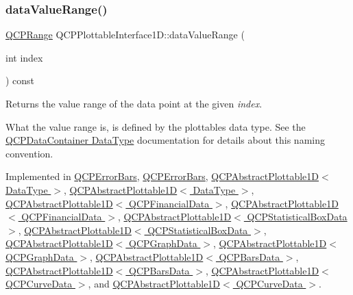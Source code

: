 \subsubsection{\texorpdfstring{data\+Value\+Range()}{dataValueRange()}}
{\footnotesize\ttfamily \hyperlink{class_q_c_p_range}{Q\+C\+P\+Range} Q\+C\+P\+Plottable\+Interface1\+D\+::data\+Value\+Range (\begin{DoxyParamCaption}\item[{int}]{index }\end{DoxyParamCaption}) const\hspace{0.3cm}{\ttfamily [pure virtual]}}

Returns the value range of the data point at the given {\itshape index}.

What the value range is, is defined by the plottable\textquotesingle{}s data type. See the \hyperlink{class_q_c_p_data_container_qcpdatacontainer-datatype}{Q\+C\+P\+Data\+Container Data\+Type} documentation for details about this naming convention. 

Implemented in \hyperlink{class_q_c_p_error_bars_a09b99cf293b6041ae8d5c52cf8dd599c}{Q\+C\+P\+Error\+Bars}, \hyperlink{class_q_c_p_error_bars_af3a66650bc2a36b06a7d77f879b7eb8c}{Q\+C\+P\+Error\+Bars}, \hyperlink{class_q_c_p_abstract_plottable1_d_ac6201b01aee550ef0a240183781d1f9a}{Q\+C\+P\+Abstract\+Plottable1\+D$<$ Data\+Type $>$}, \hyperlink{class_q_c_p_abstract_plottable1_d_a3070f8b8ce4729ea60837aac603aa0f9}{Q\+C\+P\+Abstract\+Plottable1\+D$<$ Data\+Type $>$}, \hyperlink{class_q_c_p_abstract_plottable1_d_ac6201b01aee550ef0a240183781d1f9a}{Q\+C\+P\+Abstract\+Plottable1\+D$<$ Q\+C\+P\+Financial\+Data $>$}, \hyperlink{class_q_c_p_abstract_plottable1_d_a3070f8b8ce4729ea60837aac603aa0f9}{Q\+C\+P\+Abstract\+Plottable1\+D$<$ Q\+C\+P\+Financial\+Data $>$}, \hyperlink{class_q_c_p_abstract_plottable1_d_ac6201b01aee550ef0a240183781d1f9a}{Q\+C\+P\+Abstract\+Plottable1\+D$<$ Q\+C\+P\+Statistical\+Box\+Data $>$}, \hyperlink{class_q_c_p_abstract_plottable1_d_a3070f8b8ce4729ea60837aac603aa0f9}{Q\+C\+P\+Abstract\+Plottable1\+D$<$ Q\+C\+P\+Statistical\+Box\+Data $>$}, \hyperlink{class_q_c_p_abstract_plottable1_d_ac6201b01aee550ef0a240183781d1f9a}{Q\+C\+P\+Abstract\+Plottable1\+D$<$ Q\+C\+P\+Graph\+Data $>$}, \hyperlink{class_q_c_p_abstract_plottable1_d_a3070f8b8ce4729ea60837aac603aa0f9}{Q\+C\+P\+Abstract\+Plottable1\+D$<$ Q\+C\+P\+Graph\+Data $>$}, \hyperlink{class_q_c_p_abstract_plottable1_d_ac6201b01aee550ef0a240183781d1f9a}{Q\+C\+P\+Abstract\+Plottable1\+D$<$ Q\+C\+P\+Bars\+Data $>$}, \hyperlink{class_q_c_p_abstract_plottable1_d_a3070f8b8ce4729ea60837aac603aa0f9}{Q\+C\+P\+Abstract\+Plottable1\+D$<$ Q\+C\+P\+Bars\+Data $>$}, \hyperlink{class_q_c_p_abstract_plottable1_d_ac6201b01aee550ef0a240183781d1f9a}{Q\+C\+P\+Abstract\+Plottable1\+D$<$ Q\+C\+P\+Curve\+Data $>$}, and \hyperlink{class_q_c_p_abstract_plottable1_d_a3070f8b8ce4729ea60837aac603aa0f9}{Q\+C\+P\+Abstract\+Plottable1\+D$<$ Q\+C\+P\+Curve\+Data $>$}.

